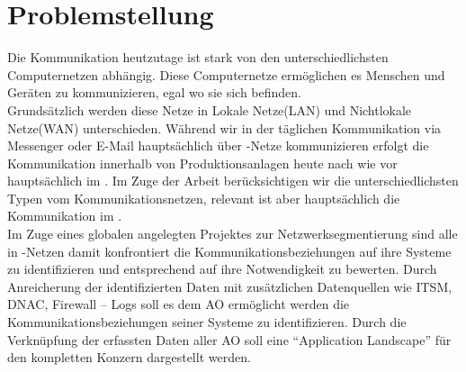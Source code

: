 \chapter{Problemstellung}
\label{ch:Problemstellung}
Die Kommunikation heutzutage ist stark von den unterschiedlichsten Computernetzen abhängig. Diese Computernetze ermöglichen es Menschen und Geräten zu kommunizieren, egal wo sie sich befinden.
\\
Grundsätzlich werden diese Netze in \glqq Lokale Netze(LAN)\grqq{} und \glqq Nichtlokale Netze(WAN)\grqq{} unterschieden. Während wir in der täglichen Kommunikation via Messenger oder E-Mail hauptsächlich über \wan-Netze kommunizieren erfolgt die Kommunikation innerhalb von Produktionsanlagen heute nach wie vor hauptsächlich im \lan. Im Zuge der Arbeit berücksichtigen wir die unterschiedlichsten Typen vom Kommunikationsnetzen, relevant ist aber hauptsächlich die Kommunikation im \lan.
\\
Im Zuge eines globalen angelegten Projektes zur Netzwerksegmentierung sind alle \so{} in \ot{}-Netzen damit konfrontiert die Kommunikationsbeziehungen auf ihre Systeme zu identifizieren und entsprechend auf ihre Notwendigkeit zu bewerten. Durch Anreicherung der identifizierten Daten mit zusätzlichen Datenquellen wie ITSM, DNAC, Firewall – Logs soll es dem AO ermöglicht werden die Kommunikationsbeziehungen seiner Systeme zu identifizieren.
Durch die Verknüpfung der erfassten Daten aller AO soll eine “Application Landscape” für den kompletten Konzern dargestellt werden. 
